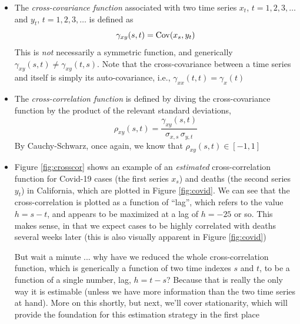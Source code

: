 \documentclass{article}
\begin{document}
\begin{itemize}
\item The \emph{cross-covariance function} associated with two time series $x_t$, 
  $t=1,2,3,\dots$ and $y_t$, $t=1,2,3,\dots$ is defined as
  \[
  \gamma_{xy}(s,t) = \operatorname{Cov}(x_s, y_t)
  \]
  This is \emph{not} necessarily a symmetric function, and generically
  $\gamma_{xy}(s,t) \not= \gamma_{xy}(t,s)$. Note that the cross-covariance
  between a time series and itself is simply its auto-covariance, i.e.,
  $\gamma_{xx}(t,t) = \gamma_x(t)$

\item The \emph{cross-correlation function} is defined by diving the
  cross-covariance function by the product of the relevant standard deviations, 
  \[
  \rho_{xy}(s,t) = \frac{\gamma_{xy}(s,t)}{\sigma_{x,s} \, \sigma_{y,t}}
  \]
  By Cauchy-Schwarz, once again, we know that $\rho_{xy}(s,t) \in [-1,1]$

\item Figure \ref{fig:crosscor} shows an example of an \emph{estimated}
  cross-correlation function for Covid-19 cases (the first series $x_s$) and 
  deaths (the second series $y_t$) in California, which are plotted in Figure
  \ref{fig:covid}. We can see that the cross-correlation is plotted as a
  function of ``lag'', which refers to the value $h = s-t$, and appears to be  
  maximized at a lag of $h = -25$ or so. This makes sense, in that we expect
  cases to be highly correlated with deaths several weeks later (this is also
  visually apparent in Figure \ref{fig:covid})  

  But wait a minute ... why have we reduced the whole cross-correlation
  function, which is generically a function of two time indexes $s$ and $t$, to
  be a function of a single number, lag, $h = t-s$? Because that is really the
  only way it is estimable (unless we have more information than the two time
  series at hand). More on this shortly, but next, we'll cover stationarity,
  which will provide the foundation for this estimation strategy in the first
  place 
\end{itemize}
\end{document}
